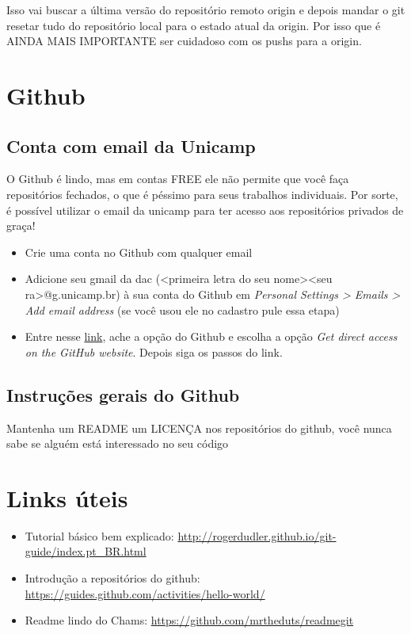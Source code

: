 \documentclass[12pt]{article}
\begin{document}
\begin{doublespacing}
Isso vai buscar a última versão do repositório remoto origin e depois mandar o git resetar tudo do repositório local para o estado atual da origin. Por isso que é AINDA MAIS IMPORTANTE ser cuidadoso com os pushs para a origin.

\section{Github}
\subsection{Conta com email da Unicamp}
O Github é lindo, mas em contas FREE ele não permite que você faça repositórios fechados, o que é péssimo para seus trabalhos individuais. Por sorte, é possível utilizar o email da unicamp para ter acesso aos repositórios privados de graça!
\begin{itemize}
\item Crie uma conta no Github com qualquer email
\item Adicione seu gmail da dac (<primeira letra do seu nome><seu ra>@g.unicamp.br) à sua conta do Github em \textit{Personal Settings > Emails > Add email address } (se você usou ele no cadastro pule essa etapa) 
\item Entre nesse \href{https://education.github.com/pack/offers}{link}, ache a opção do Github e escolha a opção \textit{Get direct access on the GitHub website}. Depois siga os passos do link.
\end{itemize}

\subsection{Instruções gerais do Github}
Mantenha um README um LICENÇA nos repositórios do github, você nunca sabe se alguém está interessado no seu código

\section{Links úteis}
\begin{itemize}
\item Tutorial básico bem explicado: \url{http://rogerdudler.github.io/git-guide/index.pt_BR.html}
\item Introdução a repositórios do github: \url{https://guides.github.com/activities/hello-world/}
\item Readme lindo do Chams: \url{https://github.com/mrtheduts/readmegit}

\end{itemize}


\end{doublespacing}
\end{document}
